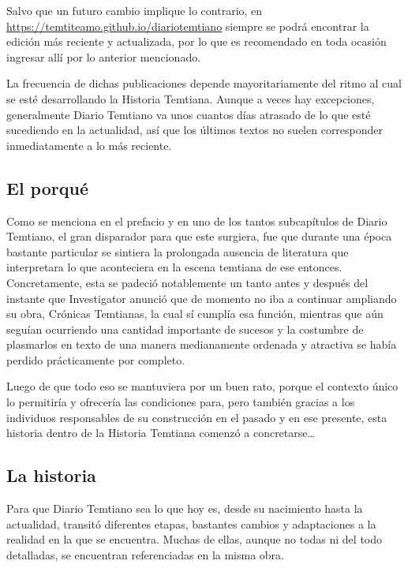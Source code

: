 \documentclass[
  spanish,
]{book}
\begin{document}
Salvo que un futuro cambio implique lo contrario, en \url{https://temtiteamo.github.io/diariotemtiano} siempre se podrá encontrar la edición más reciente y actualizada, por lo que es recomendado en toda ocasión ingresar allí por lo anterior mencionado.

La frecuencia de dichas publicaciones depende mayoritariamente del ritmo al cual se esté desarrollando la Historia Temtiana. Aunque a veces hay excepciones, generalmente Diario Temtiano va unos cuantos días atrasado de lo que esté sucediendo en la actualidad, así que los últimos textos no suelen corresponder inmediatamente a lo más reciente.

\hypertarget{el-porquuxe9}{%
\subsection*{El porqué}\label{el-porquuxe9}}

Como se menciona en el prefacio y en uno de los tantos subcapítulos de Diario Temtiano, el gran disparador para que este surgiera, fue que durante una época bastante particular se sintiera la prolongada ausencia de literatura que interpretara lo que aconteciera en la escena temtiana de ese entonces. Concretamente, esta se padeció notablemente un tanto antes y después del instante que Investigator anunció que de momento no iba a continuar ampliando su obra, Crónicas Temtianas, la cual sí cumplía esa función, mientras que aún seguían ocurriendo una cantidad importante de sucesos y la costumbre de plasmarlos en texto de una manera medianamente ordenada y atractiva se había perdido prácticamente por completo.

Luego de que todo eso se mantuviera por un buen rato, porque el contexto único lo permitiría y ofrecería las condiciones para, pero también gracias a los individuos responsables de su construcción en el pasado y en ese presente, esta historia dentro de la Historia Temtiana comenzó a concretarse\ldots{}

\hypertarget{la-historia}{%
\subsection*{La historia}\label{la-historia}}

Para que Diario Temtiano sea lo que hoy es, desde su nacimiento hasta la actualidad, transitó diferentes etapas, bastantes cambios y adaptaciones a la realidad en la que se encuentra. Muchas de ellas, aunque no todas ni del todo detalladas, se encuentran referenciadas en la misma obra.
\end{document}
